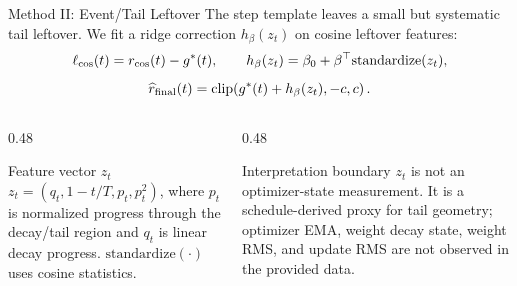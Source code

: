 \documentclass[fontset=fandol,aspectratio=169,10pt]{ctexbeamer}
\begin{document}
\begin{frame}{Method II: Event/Tail Leftover}
  The step template leaves a small but systematic tail leftover. We fit a
  ridge correction \(h_\beta(z_t)\) on cosine leftover features:
  \[
    \ell_{\rm cos}(t)=r_{\rm cos}(t)-g^*(t),\qquad
    h_\beta(z_t)=\beta_0+\beta^\top\mathrm{standardize}(z_t),
  \]
  \[
    \widehat r_{\rm final}(t)=
    \mathrm{clip}\!\left(g^*(t)+h_\beta(z_t),-c,c\right).
  \]
  \begin{columns}[T,onlytextwidth]
    \begin{column}{0.48\textwidth}
      \begin{block}{Feature vector \(z_t\)}
        \(z_t=(q_t,1-t/T,p_t,p_t^2)\), where \(p_t\) is normalized progress
        through the decay/tail region and \(q_t\) is linear decay progress.
        \(\mathrm{standardize}(\cdot)\) uses cosine statistics.
      \end{block}
    \end{column}
    \begin{column}{0.48\textwidth}
      \begin{alertblock}{Interpretation boundary}
        \(z_t\) is not an optimizer-state measurement. It is a schedule-derived
        proxy for tail geometry; optimizer EMA, weight decay state, weight RMS,
        and update RMS are not observed in the provided data.
      \end{alertblock}
    \end{column}
  \end{columns}
\end{frame}
\end{document}
